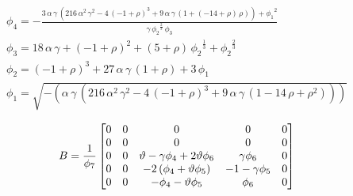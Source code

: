 \begin{gather*}
\phi_4=-{\frac{3\,\alpha\,\gamma\,\left( 216\,{{\alpha}^2}\,{{\gamma}^2} - 
         4\,{{\left( -1 + \rho \right) }^3} + 
         9\,\alpha\,\gamma\,\left( 1 + \left( -14 + \rho \right) \,\rho
            \right)  \right)  + {{{{\phi}_1}}^2}}{\gamma\,
      {{{{\phi}_2}}^{{\frac{2}{3}}}}\,{{\phi}_3}}}\\
\phi_3=18\,\alpha\,\gamma + {{\left( -1 + \rho \right) }^2} + 
  \left( 5 + \rho \right) \,{{{{\phi}_2}}^{{\frac{1}{3}}}} + 
  {{{{\phi}_2}}^{{\frac{2}{3}}}}\\
\phi_2={{\left( -1 + \rho \right) }^3} + 
  27\,\alpha\,\gamma\,\left( 1 + \rho \right)  + 3\,{{\phi}_1}\\
\phi_1={\sqrt{-\left( \alpha\,\gamma\,\left( 216\,{{\alpha}^2}\,{{\gamma}^2} - 
         4\,{{\left( -1 + \rho \right) }^3} + 
         9\,\alpha\,\gamma\,\left( 1 - 14\,\rho + {{\rho}^2} \right)  \right) 
        \right) }}
  \end{gather*}



  \begin{gather*}
    B= \frac{1}{\phi_7} \begin{bmatrix}
0 & 0 & 0 & 0 & 0\\
0 & 0 & 0 & 0 & 0\\
0 & 0 & \vartheta - \gamma{{\phi} _4} + 2\vartheta{{\phi} _6} &
  \gamma{{\phi} _6} & 0\\
0 & 0 & -2\left( {{\phi} _ 4} + \vartheta{{\phi} _5} \right) 
  & -1 - \gamma{{\phi} _5} & 0\\
0 & 0 & -{{\phi} _ 4} - \vartheta{{\phi} _5} & {{\phi} _ 6}
  & 0
  \end{bmatrix}
  \end{gather*}

